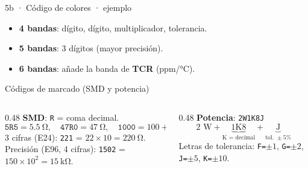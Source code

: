 \documentclass[aspectratio=169]{beamer}
\begin{document}
\begin{frame}{5b · Código de colores · ejemplo}
  \begin{center}
  \end{center}
  \begin{itemize}
    \item \textbf{4 bandas}: dígito, dígito, multiplicador, tolerancia.
    \item \textbf{5 bandas}: 3 dígitos (mayor precisión).
    \item \textbf{6 bandas}: añade la banda de \textbf{TCR} (ppm/°C).
  \end{itemize}
\end{frame}

\begin{frame}{Códigos de marcado (SMD y potencia)}
  \begin{columns}[T]
    \begin{column}{0.48\textwidth}
      \textbf{SMD}: \texttt{R} = coma decimal.
      \[
        \texttt{5R5} = \SI{5.5}{\ohm},\quad
        \texttt{47R0} = \SI{47}{\ohm},\quad
        \texttt{1000} = 100 + 0\ \text{ceros} = \SI{100}{\ohm}
      \]
      \small 3 cifras (E24): \texttt{221} = $22\times10 = \SI{220}{\ohm}$.
      \\Precisión (E96, 4 cifras): \texttt{1502} = $150\times10^2 = \SI{15}{\kilo\ohm}$.
    \end{column}
    \begin{column}{0.48\textwidth}
      \textbf{Potencia}: \texttt{2W1K8J}
      \[
        \text{2 W} + \underbrace{\text{1K8}}_{\text{K = decimal}} + \underbrace{\text{J}}_{\text{tol. } \pm5\text{\%}}
      \]
      \small Letras de tolerancia: \texttt{F=$\pm1$\text{\%}}, \texttt{G=$\pm2$\text{\%}},
      \texttt{J=$\pm5$\text{\%}}, \texttt{K=$\pm10$\text{\%}}.
    \end{column}
  \end{columns}
\end{frame}
\end{document}
